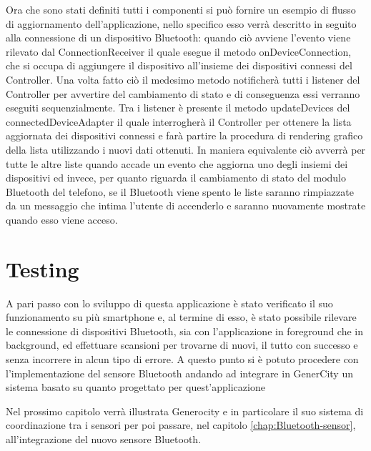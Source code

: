 Ora che sono stati definiti tutti i componenti si può fornire un esempio di flusso di aggiornamento dell'applicazione, nello specifico esso verrà descritto in seguito alla connessione di un dispositivo Bluetooth: quando ciò avviene l'evento viene rilevato dal ConnectionReceiver il quale esegue il metodo onDeviceConnection, che si occupa di aggiungere il dispositivo all'insieme dei dispositivi connessi del Controller. Una volta fatto ciò il medesimo metodo notificherà tutti i listener del Controller per avvertire del cambiamento di stato e di conseguenza essi verranno eseguiti sequenzialmente. Tra i listener è presente il metodo updateDevices del connectedDeviceAdapter il quale interrogherà il Controller per ottenere la lista aggiornata dei dispositivi connessi e farà partire la procedura di rendering grafico della lista utilizzando i nuovi dati ottenuti. In maniera equivalente ciò avverrà per tutte le altre liste quando accade un evento che aggiorna uno degli insiemi dei dispositivi ed invece, per quanto riguarda il cambiamento di stato del modulo Bluetooth del telefono, se il Bluetooth viene spento le liste saranno rimpiazzate da un messaggio che intima l'utente di accenderlo e saranno nuovamente mostrate quando esso viene acceso. 

\section{Testing}
A pari passo con lo sviluppo di questa applicazione è stato verificato il suo funzionamento su più smartphone e, al termine di esso, è stato possibile rilevare le connessione di dispositivi Bluetooth, sia con l'applicazione in foreground che in background, ed effettuare scansioni per trovarne di nuovi, il tutto con successo e senza incorrere in alcun tipo di errore. A questo punto si è potuto procedere con l'implementazione del sensore Bluetooth andando ad integrare in GenerCity un sistema basato su quanto progettato per quest'applicazione

Nel prossimo capitolo verrà illustrata Generocity e in particolare il suo sistema di coordinazione tra i sensori per poi passare, nel capitolo \ref{chap:Bluetooth-sensor}, all'integrazione del nuovo sensore Bluetooth.